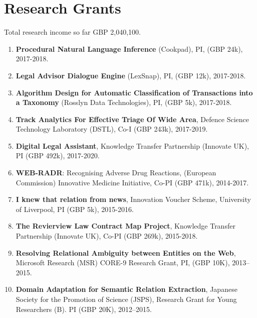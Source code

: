 \documentclass[a4paper,11pt]{article}
\begin{document}
\section{Research Grants}

Total research income so far GBP 2,040,100.

\begin{enumerate}

\item \textbf{Procedural Natural Language Inference} (Cookpad), PI, (GBP 24k), 2017-2018.

\item \textbf{Legal Advisor Dialogue Engine} (LexSnap), PI, (GBP 12k), 2017-2018.

\item \textbf{Algorithm Design for Automatic Classification of Transactions into a Taxonomy} (Rosslyn Data Technologies), PI, (GBP 5k), 2017-2018.


\item \textbf{Track Analytics For Effective Triage Of Wide Area}, Defence Science Technology Laboratory (DSTL), Co-I (GBP 243k), 2017-2019.

\item \textbf{Digital Legal Assistant}, Knowledge Transfer Partnership (Innovate UK), PI (GBP 492k), 2017-2020.

\item \textbf{WEB-RADR}: Recognising Adverse Drug Reactions, (European Commission) Innovative Medicine Initiative, Co-PI (GBP 471k), 2014-2017.

\item \textbf{I knew that relation from news}, Innovation Voucher Scheme, University of Liverpool, PI (GBP 5k), 2015-2016.

\item \textbf{The Revierview Law Contract Map Project}, Knowledge Transfer Partnership (Innovate UK), Co-PI (GBP 269k), 2015-2018.

\item \textbf{Resolving Relational Ambiguity between Entities on the Web}, Microsoft Research (MSR) CORE-9 Research Grant, PI, (GBP 10K), 2013–2015.

\item \textbf{Domain Adaptation for Semantic Relation Extraction}, Japanese Society for the Promotion of Science (JSPS), Research Grant for Young Researchers (B). PI (GBP 20K), 2012–2015.


\end{enumerate}
\end{document}
